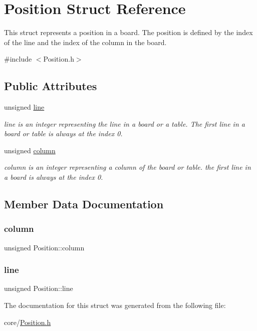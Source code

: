 \hypertarget{structPosition}{}\section{Position Struct Reference}
\label{structPosition}


This struct represents a position in a board. The position is defined by the index of the line and the index of the column in the board.  




{\ttfamily \#include $<$Position.\+h$>$}

\subsection*{Public Attributes}
\begin{DoxyCompactItemize}
\item 
unsigned \mbox{\hyperlink{structPosition_a4f14bf944da79faec59c382928478f40}{line}}
\begin{DoxyCompactList}\small\item\em line is an integer representing the line in a board or a table. The first line in a board or table is always at the index 0. \end{DoxyCompactList}\item 
unsigned \mbox{\hyperlink{structPosition_a327dcf07f5c621405150758cb46d7750}{column}}
\begin{DoxyCompactList}\small\item\em column is an integer representing a column of the board or table. the first line in a board is always at the index 0. \end{DoxyCompactList}\end{DoxyCompactItemize}


\subsection{Member Data Documentation}
\mbox{\label{structPosition_a327dcf07f5c621405150758cb46d7750}} 
\subsubsection{\texorpdfstring{column}{column}}
{\footnotesize\ttfamily unsigned Position\+::column}

\mbox{\label{structPosition_a4f14bf944da79faec59c382928478f40}} 
\subsubsection{\texorpdfstring{line}{line}}
{\footnotesize\ttfamily unsigned Position\+::line}



The documentation for this struct was generated from the following file\+:\begin{DoxyCompactItemize}
\item 
core/\mbox{\hyperlink{Position_8h}{Position.\+h}}\end{DoxyCompactItemize}
